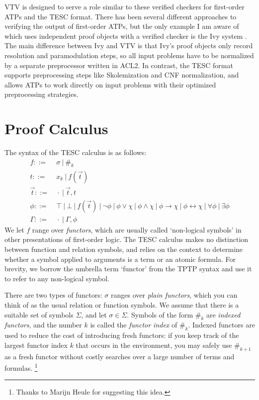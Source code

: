 \documentclass[12pt]{article}
\newcommand{\idf}[1]{\#_{#1}}
\begin{document}
VTV is designed to serve a role similar to these verified checkers for 
first-order ATPs and the TESC format. There has been several different 
approaches \cite{sutcliffe2006semantic, chihani2015proof} to verifying 
the output of first-order ATPs, but the only example I am aware of
which uses independent proof objects with a verified checker is the 
Ivy system \cite{mccune2000ivy}. The main difference between Ivy and 
VTV is that Ivy's proof objects only record resolution and paramodulation 
steps, so all input problems have to be normalized by a separate 
preprocessor written in ACL2. In contrast, the TESC format supports 
preprocessing steps like Skolemization and CNF normalization, and 
allows ATPs to work directly on input problems with their optimized 
preprocessing strategies.



\section{Proof Calculus} \label{sec:proof-calc} 

The syntax of the TESC calculus is as follows:
\begin{align*}
f ::= &\ \sigma\ |\ \idf{k}\\
t ::= &\ x_k\ |\ f(\vec{t})\\
\vec{t} ::= &\ \cdot\ |\ \vec{t}, t\\
\phi ::= &\ \top\ |\ \bot\ |\ f(\vec{t})\ |\ \lnot \phi\ |\ \phi \lor \chi\ |\ \phi \land \chi\ |\ \phi \to \chi\ |\ \phi \leftrightarrow \chi\ |\ \forall \phi\ |\ \exists \phi\\
\Gamma ::= &\ \cdot\ |\ \Gamma, \phi
\end{align*}
We let $f$ range over \textit{functors}, which are usually called `non-logical symbols' in
other presentations of first-order logic. The TESC calculus makes no distinction
between function and relation symbols, and relies on the context to determine whether 
a symbol applied to arguments is a term or an atomic formula. For brevity, we borrow
the umbrella term `functor' from the TPTP syntax and use it to refer to any non-logical symbol.

There are two types of functors: $\sigma$ ranges over \textit{plain functors}, 
which you can think of as the usual relation or function symbols. We assume that there 
is a suitable set of symbols $\Sigma$, and let $\sigma \in \Sigma$.
Symbols of the form $\idf{k}$ are \textit{indexed functors}, and the number $k$ is 
called the \textit{functor index} of $\idf{k}$. Indexed functors are used to reduce 
the cost of introducing fresh functors: if you keep track of the largest functor index
$k$ that occurs in the environment, you may safely use $\idf{k+1}$ as a fresh functor
without costly searches over a large number of terms and formulas. \footnote{Thanks to Marijn Heule for suggesting this idea.}
\end{document}
